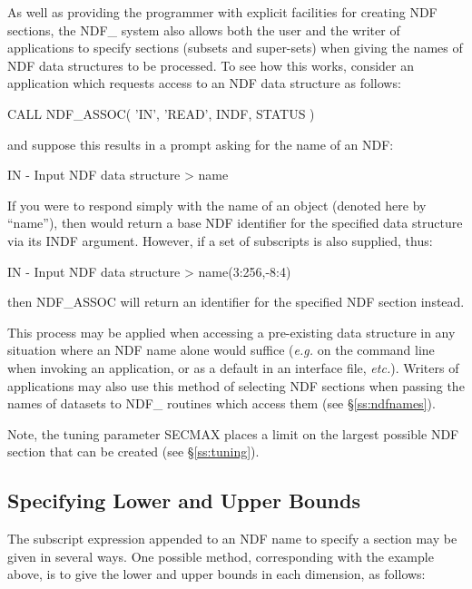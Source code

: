 \documentclass[twoside,11pt,nolof]{starlink}
\providecommand{\st}[1]{{\emph{#1}}}
\begin{document}
As well as providing the programmer with explicit facilities for
creating NDF sections, the NDF\_ system also allows both the user and
the writer of applications to specify sections (subsets and
super-sets) when giving the names of NDF data structures to be
processed. To see how this works, consider an application which
requests access to an NDF data structure as follows:

\small
\begin{terminalv}
      CALL NDF_ASSOC( 'IN', 'READ', INDF, STATUS )
\end{terminalv}
\normalsize

and suppose this results in a prompt asking for the name of an NDF:

\small
\begin{terminalv}
   IN - Input NDF data structure > name
\end{terminalv}
\normalsize

If you were to respond simply with the name of an 
object (denoted here by ``name''), then  would return a base
NDF identifier for the specified data structure via its INDF
argument. However, if a set of subscripts is also supplied, thus:

\small
\begin{terminalv}
   IN - Input NDF data structure > name(3:256,-8:4)
\end{terminalv}
\normalsize

then NDF\_ASSOC will return an identifier for the specified NDF section
instead.

This process may be applied when accessing a pre-existing data
structure in any situation where an NDF name alone would suffice
(\st{e.g.\/} on the command line when invoking an application, or as a
default in an interface file, \st{etc.}). Writers of applications may
also use this method of selecting NDF sections when passing the names
of datasets to NDF\_ routines which access them (see
\S\ref{ss:ndfnames}).

Note, the tuning parameter SECMAX places a limit on the largest possible
NDF section that can be created (see \S\ref{ss:tuning}).

\subsection{Specifying Lower and Upper Bounds}

The subscript expression appended to an NDF name to specify a section
may be given in several ways. One possible method, corresponding with
the example above, is to give the lower and upper bounds in each
dimension, as follows:
\end{document}

